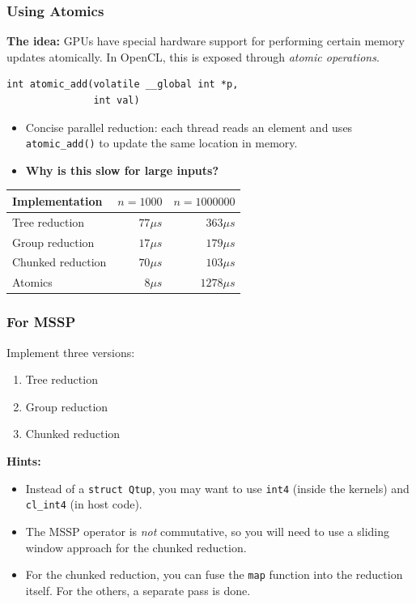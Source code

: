 \documentclass{beamer}
\begin{document}
\begin{frame}[fragile]
  \frametitle{Using Atomics}

  \textbf{The idea:} GPUs have special hardware support for performing
  certain memory updates atomically.  In OpenCL, this is exposed
  through \textit{atomic operations}.

\begin{lstlisting}[backgroundcolor=\color{lightgray}]
int atomic_add(volatile __global int *p,
               int val)
\end{lstlisting}

  \begin{itemize}
  \item Concise parallel reduction: each thread reads an element and
    uses \texttt{atomic\_add()} to update the same location in memory.
  \item \textbf{Why is this slow for large inputs?}
  \end{itemize}

\pause\bigskip

  \begin{tabular}{lrr}
    \textbf{Implementation} & $n=1000$ & $n=1000000$ \\\hline
    Tree reduction & $77\mu{}s$ & $363\mu{}s$ \\
    Group reduction & $17\mu{}s$ & $179\mu{}s$ \\
    Chunked reduction & $70\mu{}s$ & $103\mu{}s$ \\
    Atomics & $8\mu{}s$ & $1278\mu{}s$ \\
  \end{tabular}

\end{frame}

\begin{frame}
  \frametitle{For MSSP}

  Implement three versions:

  \begin{enumerate}
  \item Tree reduction
  \item Group reduction
  \item Chunked reduction
  \end{enumerate}

  \textbf{Hints:}
  \begin{itemize}
  \item Instead of a \texttt{struct Qtup}, you may want to use
    \texttt{int4} (inside the kernels) and \texttt{cl\_int4} (in host
    code).
  \item The MSSP operator is \textit{not} commutative, so you will
    need to use a sliding window approach for the chunked reduction.
  \item For the chunked reduction, you can fuse the \texttt{map}
    function into the reduction itself.  For the others, a separate
    pass is done.
  \end{itemize}

\end{frame}
\end{document}
